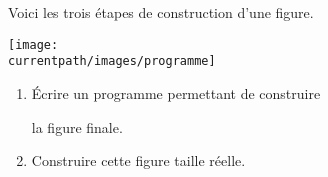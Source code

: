 \begin{exercice}
    Voici les trois étapes de construction d'une figure.
    \begin{center}
       \texttt{[image: \\currentpath/images/programme]}
    \end{center}
    \vspace*{-6mm}
    \begin{enumerate}
       \item Écrire un programme permettant de construire 
       
       la figure finale.
       \item Construire cette figure taille réelle.
    \end{enumerate}
 \end{exercice}
 